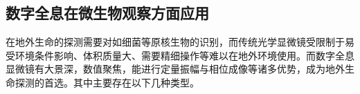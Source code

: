 \documentclass{article}
\begin{document}
\subsection{数字全息在微生物观察方面应用}
\songti{}\indent 在地外生命的探测需要对如细菌等原核生物的识别，而传统光学显微镜受限制于易受环境条件影响、体积质量大、需要精细操作等难以在地外环境使用。而数字全息显微镜有大景深，数值聚焦，能进行定量振幅与相位成像等诸多优势，成为地外生命探测的首选。其中主要存在以下几种类型。

\begin{figure}[!h]
	\centering
	

\end{figure}
\end{document}
